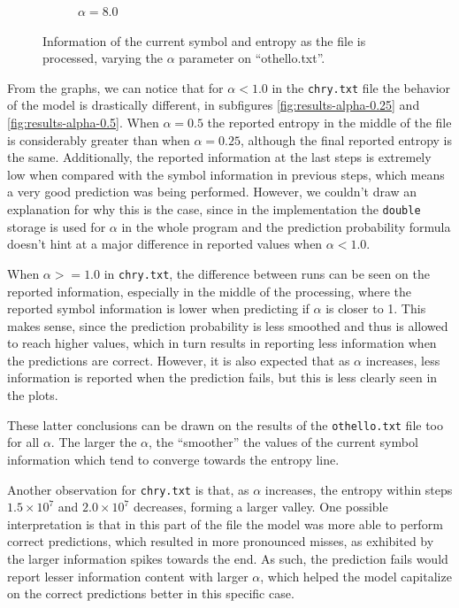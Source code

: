 \documentclass{article}
\begin{document}
\begin{figure}
\begin{subfigure}[b]{0.3\textwidth}
\begin{center}
        \end{center}
        \caption{$\alpha = 8.0$}
        \label{fig:results-alpha-other-8.0}
    \end{subfigure}
    \caption{Information of the current symbol and entropy as the file is processed, varying the $\alpha$ parameter on ``othello.txt''.}
    \label{fig:results-alpha-other}
\end{figure}

From the graphs, we can notice that for $\alpha < 1.0$ in the \verb|chry.txt| file the behavior of the model is drastically different, in subfigures \ref{fig:results-alpha-0.25} and \ref{fig:results-alpha-0.5}.
When $\alpha = 0.5$ the reported entropy in the middle of the file is considerably greater than when $\alpha = 0.25$, although the final reported entropy is the same.
Additionally, the reported information at the last steps is extremely low when compared with the symbol information in previous steps, which means a very good prediction was being performed.
However, we couldn't draw an explanation for why this is the case, since in the implementation the \verb|double| storage is used for $\alpha$ in the whole program and the prediction probability formula doesn't hint at a major difference in reported values when $\alpha < 1.0$.

When $\alpha >= 1.0$ in \verb|chry.txt|, the difference between runs can be seen on the reported information, especially in the middle of the processing, where the reported symbol information is lower when predicting if $\alpha$ is closer to 1.
This makes sense, since the prediction probability is less smoothed and thus is allowed to reach higher values, which in turn results in reporting less information when the predictions are correct.
However, it is also expected that as $\alpha$ increases, less information is reported when the prediction fails, but this is less clearly seen in the plots.

These latter conclusions can be drawn on the results of the \verb|othello.txt| file too for all $\alpha$.
The larger the $\alpha$, the ``smoother'' the values of the current symbol information which tend to converge towards the entropy line.

Another observation for \verb|chry.txt| is that, as $\alpha$ increases, the entropy within steps $1.5\times10^7$ and $2.0\times10^7$ decreases, forming a larger valley.
One possible interpretation is that in this part of the file the model was more able to perform correct predictions, which resulted in more pronounced misses, as exhibited by the larger information spikes towards the end.
As such, the prediction fails would report lesser information content with larger $\alpha$, which helped the model capitalize on the correct predictions better in this specific case.
\end{document}
